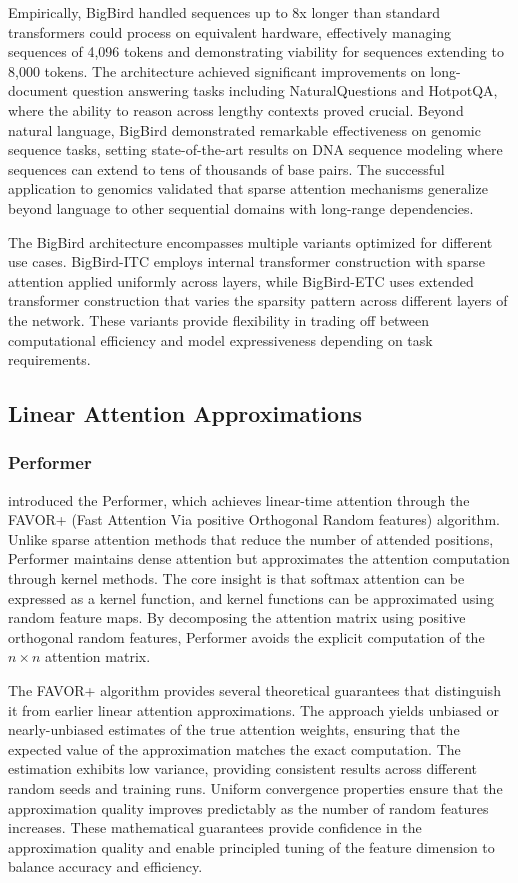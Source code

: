 Empirically, BigBird handled sequences up to 8x longer than standard transformers could process on equivalent hardware, effectively managing sequences of 4,096 tokens and demonstrating viability for sequences extending to 8,000 tokens. The architecture achieved significant improvements on long-document question answering tasks including NaturalQuestions and HotpotQA, where the ability to reason across lengthy contexts proved crucial. Beyond natural language, BigBird demonstrated remarkable effectiveness on genomic sequence tasks, setting state-of-the-art results on DNA sequence modeling where sequences can extend to tens of thousands of base pairs. The successful application to genomics validated that sparse attention mechanisms generalize beyond language to other sequential domains with long-range dependencies.

The BigBird architecture encompasses multiple variants optimized for different use cases. BigBird-ITC employs internal transformer construction with sparse attention applied uniformly across layers, while BigBird-ETC uses extended transformer construction that varies the sparsity pattern across different layers of the network. These variants provide flexibility in trading off between computational efficiency and model expressiveness depending on task requirements.

\subsection{Linear Attention Approximations}

\subsubsection{Performer}

\citet{choromanski2021rethinking} introduced the Performer, which achieves linear-time attention through the FAVOR+ (Fast Attention Via positive Orthogonal Random features) algorithm. Unlike sparse attention methods that reduce the number of attended positions, Performer maintains dense attention but approximates the attention computation through kernel methods. The core insight is that softmax attention can be expressed as a kernel function, and kernel functions can be approximated using random feature maps. By decomposing the attention matrix using positive orthogonal random features, Performer avoids the explicit computation of the $n \times n$ attention matrix.

The FAVOR+ algorithm provides several theoretical guarantees that distinguish it from earlier linear attention approximations. The approach yields unbiased or nearly-unbiased estimates of the true attention weights, ensuring that the expected value of the approximation matches the exact computation. The estimation exhibits low variance, providing consistent results across different random seeds and training runs. Uniform convergence properties ensure that the approximation quality improves predictably as the number of random features increases. These mathematical guarantees provide confidence in the approximation quality and enable principled tuning of the feature dimension to balance accuracy and efficiency.


